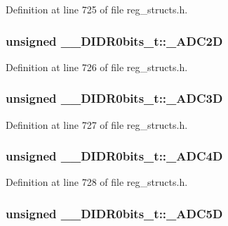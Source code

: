 Definition at line 725 of file reg\+\_\+structs.\+h.

\hypertarget{union_____d_i_d_r0bits__t_a3b2f7278ddcc429c2233a10814729776}{
\subsubsection[{\+\_\+\+A\+D\+C2\+D}]{\setlength{\rightskip}{0pt plus 5cm}unsigned \+\_\+\+\_\+\+D\+I\+D\+R0bits\+\_\+t\+::\+\_\+\+A\+D\+C2\+D}}\label{union_____d_i_d_r0bits__t_a3b2f7278ddcc429c2233a10814729776}


Definition at line 726 of file reg\+\_\+structs.\+h.

\hypertarget{union_____d_i_d_r0bits__t_a9bff4153a1207fbc1aa78e0cabc62684}{
\subsubsection[{\+\_\+\+A\+D\+C3\+D}]{\setlength{\rightskip}{0pt plus 5cm}unsigned \+\_\+\+\_\+\+D\+I\+D\+R0bits\+\_\+t\+::\+\_\+\+A\+D\+C3\+D}}\label{union_____d_i_d_r0bits__t_a9bff4153a1207fbc1aa78e0cabc62684}


Definition at line 727 of file reg\+\_\+structs.\+h.

\hypertarget{union_____d_i_d_r0bits__t_a1a81c3fa80c7727407d9c9473c1586c6}{
\subsubsection[{\+\_\+\+A\+D\+C4\+D}]{\setlength{\rightskip}{0pt plus 5cm}unsigned \+\_\+\+\_\+\+D\+I\+D\+R0bits\+\_\+t\+::\+\_\+\+A\+D\+C4\+D}}\label{union_____d_i_d_r0bits__t_a1a81c3fa80c7727407d9c9473c1586c6}


Definition at line 728 of file reg\+\_\+structs.\+h.

\hypertarget{union_____d_i_d_r0bits__t_afac4c7e27c681728794af58fa5d94a4c}{
\subsubsection[{\+\_\+\+A\+D\+C5\+D}]{\setlength{\rightskip}{0pt plus 5cm}unsigned \+\_\+\+\_\+\+D\+I\+D\+R0bits\+\_\+t\+::\+\_\+\+A\+D\+C5\+D}}\label{union_____d_i_d_r0bits__t_afac4c7e27c681728794af58fa5d94a4c}


